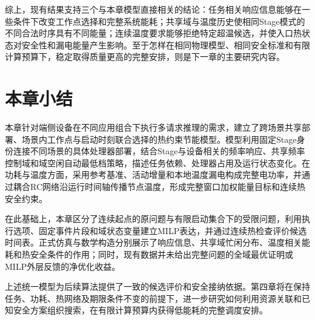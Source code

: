 综上，现有结果支持三个与本章模型直接相关的结论：任务相关响应信息能够在一些条件下改变工作点选择和完整系统能耗；共享域与温度历史使相同Stage模式的不同合法时序具有不同能量；连续温度要求能够拒绝特定超温候选，并使入口热状态对安全性和漏电能量产生影响。至于怎样在相同物理模型、相同安全标准和有限计算预算下，稳定取得质量更高的完整安排，则是下一章的主要研究内容。

\section{本章小结}

本章针对端侧设备在不同应用组合下执行多请求推理的需求，建立了跨场景共享部署、场景内工作点与启动时刻联合选择的热约束节能模型。模型利用固定Stage身份连接不同场景的具体处理器部署，结合Stage与设备相关的频率响应、共享频率控制域和域空闲自动最低档策略，描述任务依赖、处理器占用及运行状态变化。在功耗与温度方面，采用参考基准、活动增量和本地温度漏电构成完整电功率，并通过耦合RC网络沿运行时间轴传播节点温度，形成完整窗口加权能量目标和连续热安全约束。

在此基础上，本章区分了连续起点的原问题与有限启动集合下的受限问题，利用执行选项、固定事件片段和域状态变量建立MILP表达，并通过连续热检查评价候选时间表。正式仿真与数学构造分别展示了响应信息、共享域忙闲分布、温度相关能耗和热安全条件的作用；同时，现有数据并未给出完整问题的全域最优证明或MILP外层反馈的净优化收益。

上述统一模型为后续算法提供了一致的候选评价和安全接纳依据。第四章将在保持任务、功耗、热网络及期限条件不变的前提下，进一步研究如何利用资源关联和已知安全方案组织搜索，在有限计算预算内获得低能耗的完整调度安排。
